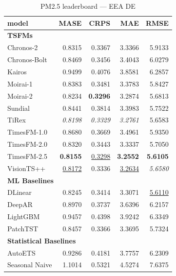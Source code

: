 \begin{table}[H]
\caption{PM2.5 leaderboard --- EEA DE}
\centering
\begin{small}
\begin{tabular}{lrrrr}
\toprule
model & MASE & CRPS & MAE & RMSE \\
\midrule
\multicolumn{5}{l}{\textbf{TSFMs}} \\
Chronos-2 & 0.8315 & 0.3367 & 3.3366 & 5.9133 \\
Chronos-Bolt & 0.8469 & 0.3456 & 3.4043 & 6.0279 \\
Kairos & 0.9499 & 0.4076 & 3.8581 & 6.2857 \\
Moirai-1 & 0.8383 & 0.3481 & 3.3783 & 5.8427 \\
Moirai-2 & 0.8234 & \textbf{0.3296} & 3.2874 & 5.6813 \\
Sundial & 0.8441 & 0.3814 & 3.3983 & 5.7522 \\
TiRex & \textit{0.8198} & \textit{0.3329} & \textit{3.2761} & 5.6583 \\
TimesFM-1.0 & 0.8680 & 0.3669 & 3.4961 & 5.9350 \\
TimesFM-2.0 & 0.8320 & 0.3443 & 3.3337 & 5.7050 \\
TimesFM-2.5 & \textbf{0.8155} & \underline{0.3298} & \textbf{3.2552} & \textbf{5.6105} \\
VisionTS++ & \underline{0.8172} & 0.3336 & \underline{3.2634} & \textit{5.6580} \\
\midrule
\multicolumn{5}{l}{\textbf{ML Baselines}} \\
DLinear & 0.8245 & 0.3414 & 3.3071 & \underline{5.6110} \\
DeepAR & 0.8970 & 0.3737 & 3.6396 & 6.2157 \\
LightGBM & 0.9457 & 0.4398 & 3.9242 & 6.3349 \\
PatchTST & 0.8457 & 0.3366 & 3.3695 & 5.7324 \\
\midrule
\multicolumn{5}{l}{\textbf{Statistical Baselines}} \\
AutoETS & 0.9286 & 0.4181 & 3.7757 & 6.2309 \\
Seasonal Naive & 1.1014 & 0.5321 & 4.5274 & 7.6375 \\
\bottomrule
\end{tabular}
\end{small}
\end{table}